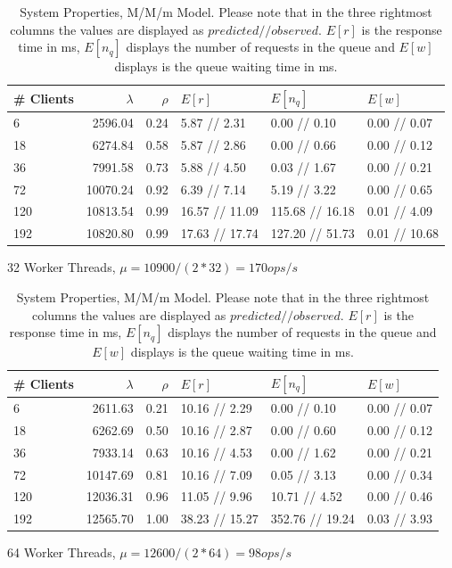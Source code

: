\documentclass[11pt,a4paper]{article}
\begin{document}
\begin{table}
    \begin{subtable}{1.0\linewidth}\centering
        \begin{tabular}{lrrlll}
        \hline
        \# Clients &  $\lambda$ &  $\rho$ &         $E[r]$ &        $E[n_q]$ &        $E[w]$ \\
        \hline
          6 &    2596.04 &    0.24 &    5.87 // 2.31 &     0.00 // 0.10 &   0.00 // 0.07 \\
         18 &    6274.84 &    0.58 &    5.87 // 2.86 &     0.00 // 0.66 &   0.00 // 0.12 \\
         36 &    7991.58 &    0.73 &    5.88 // 4.50 &     0.03 // 1.67 &   0.00 // 0.21 \\
         72 &   10070.24 &    0.92 &    6.39 // 7.14 &     5.19 // 3.22 &   0.00 // 0.65 \\
        120 &   10813.54 &    0.99 &  16.57 // 11.09 &  115.68 // 16.18 &   0.01 // 4.09 \\
        192 &   10820.80 &    0.99 &  17.63 // 17.74 &  127.20 // 51.73 &  0.01 // 10.68 \\
        \hline
        \end{tabular}
        \caption{32 Worker Threads, $\mu = 10900 / (2*32) = 170 ops/s$}
    \end{subtable}
    
    \begin{subtable}{1.0\linewidth}\centering
        \begin{tabular}{lrrlll}
        \hline
        \# Clients &  $\lambda$ &  $\rho$ &         $E[r]$ &        $E[n_q]$ &       $E[w]$ \\
        \hline
          6 &    2611.63 &    0.21 &   10.16 // 2.29 &     0.00 // 0.10 &  0.00 // 0.07 \\
         18 &    6262.69 &    0.50 &   10.16 // 2.87 &     0.00 // 0.60 &  0.00 // 0.12 \\
         36 &    7933.14 &    0.63 &   10.16 // 4.53 &     0.00 // 1.62 &  0.00 // 0.21 \\
         72 &   10147.69 &    0.81 &   10.16 // 7.09 &     0.05 // 3.13 &  0.00 // 0.34 \\
        120 &   12036.31 &    0.96 &   11.05 // 9.96 &    10.71 // 4.52 &  0.00 // 0.46 \\
        192 &   12565.70 &    1.00 &  38.23 // 15.27 &  352.76 // 19.24 &  0.03 // 3.93 \\
        \hline
        \end{tabular}
        \caption{64 Worker Threads, $\mu = 12600 / (2*64) = 98 ops/s$}
    \end{subtable}

    \caption{System Properties, M/M/m Model. Please note that in the three rightmost columns the values are displayed as $predicted  //  observed$. $E[r]$ is the response time in ms,  $E[n_q]$ displays the number of requests in the queue and $E[w]$ displays is the queue waiting time in ms.  }
    \label{MMm}
\end{table}
\end{document}
